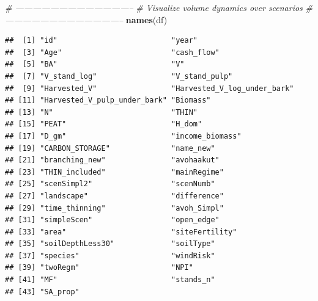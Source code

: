 \documentclass[]{elsarticle} %
\newenvironment{Shaded}{\begin{snugshade}}{\end{snugshade}}
\newcommand{\KeywordTok}[1]{\textcolor[rgb]{0.13,0.29,0.53}{\textbf{#1}}}
\newcommand{\CommentTok}[1]{\textcolor[rgb]{0.56,0.35,0.01}{\textit{#1}}}
\newcommand{\NormalTok}[1]{#1}
\begin{document}
\begin{Shaded}
\begin{Highlighting}[]
\CommentTok{# -----------------------------------------}
\CommentTok{# Visualize volume dynamics over scenarios}
\CommentTok{# -----------------------------------------}
\KeywordTok{names}\NormalTok{(df)}
\end{Highlighting}
\end{Shaded}

\begin{verbatim}
##  [1] "id"                          "year"                       
##  [3] "Age"                         "cash_flow"                  
##  [5] "BA"                          "V"                          
##  [7] "V_stand_log"                 "V_stand_pulp"               
##  [9] "Harvested_V"                 "Harvested_V_log_under_bark" 
## [11] "Harvested_V_pulp_under_bark" "Biomass"                    
## [13] "N"                           "THIN"                       
## [15] "PEAT"                        "H_dom"                      
## [17] "D_gm"                        "income_biomass"             
## [19] "CARBON_STORAGE"              "name_new"                   
## [21] "branching_new"               "avohaakut"                  
## [23] "THIN_included"               "mainRegime"                 
## [25] "scenSimpl2"                  "scenNumb"                   
## [27] "landscape"                   "difference"                 
## [29] "time_thinning"               "avoh_Simpl"                 
## [31] "simpleScen"                  "open_edge"                  
## [33] "area"                        "siteFertility"              
## [35] "soilDepthLess30"             "soilType"                   
## [37] "species"                     "windRisk"                   
## [39] "twoRegm"                     "NPI"                        
## [41] "MF"                          "stands_n"                   
## [43] "SA_prop"
\end{verbatim}
\end{document}
